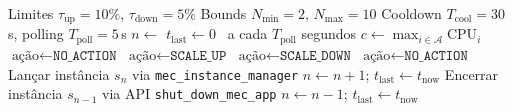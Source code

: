 \begin{algorithm}[t]
\caption{Laço MAPE-K para auto-scaling de instâncias VidProc}
\label{alg:mapek}
\begin{algorithmic}[1]
\Require Limites $\tau_{\text{up}} = 10\%$, $\tau_{\text{down}} = 5\%$
\Require Bounds $N_{\min} = 2$, $N_{\max} = 10$
\Require Cooldown $T_{\text{cool}} = 30$\,s, polling $T_{\text{poll}} = 5$\,s
\Statex
\State $n \gets$  
\State $t_{\text{last}} \gets 0$
\Loop\ a cada $T_{\text{poll}}$ segundos
    \State {}
    \State $c \gets \max_{i \in \mathcal{A}} \text{CPU}_i$ 
    \Statex
    \State {}
        \State $\text{ação} \gets \texttt{NO\_ACTION}$ 
        \State $\text{ação} \gets \texttt{SCALE\_UP}$
        \State $\text{ação} \gets \texttt{SCALE\_DOWN}$
    \Else
        \State $\text{ação} \gets \texttt{NO\_ACTION}$
    \EndIf
    \Statex
    \State {}
        \State Lançar instância $s_n$ via \texttt{mec\_instance\_manager}
            \State $n \gets n + 1$; $t_{\text{last}} \gets t_{\text{now}}$
        \EndIf
        \State Encerrar instância $s_{n-1}$ via API \texttt{shut\_down\_mec\_app}
            \State $n \gets n - 1$; $t_{\text{last}} \gets t_{\text{now}}$
        \EndIf
    \EndIf
\EndLoop
\end{algorithmic}
\end{algorithm}


%
